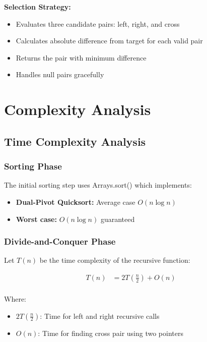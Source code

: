 \documentclass[12pt,a4paper]{article}
\begin{document}
\textbf{Selection Strategy:}
\begin{itemize}
    \item Evaluates three candidate pairs: left, right, and cross
    \item Calculates absolute difference from target for each valid pair
    \item Returns the pair with minimum difference
    \item Handles null pairs gracefully
\end{itemize}

\newpage

\section{Complexity Analysis}

\subsection{Time Complexity Analysis}

\subsubsection{Sorting Phase}
The initial sorting step uses Arrays.sort() which implements:
\begin{itemize}
    \item \textbf{Dual-Pivot Quicksort:} Average case $O(n \log n)$
    \item \textbf{Worst case:} $O(n \log n)$ guaranteed
\end{itemize}

\subsubsection{Divide-and-Conquer Phase}

Let $T(n)$ be the time complexity of the recursive function:

\begin{align}
T(n) &= 2T\left(\frac{n}{2}\right) + O(n) \\
\end{align}

Where:
\begin{itemize}
    \item $2T\left(\frac{n}{2}\right)$: Time for left and right recursive calls
    \item $O(n)$: Time for finding cross pair using two pointers
\end{itemize}
\end{document}
